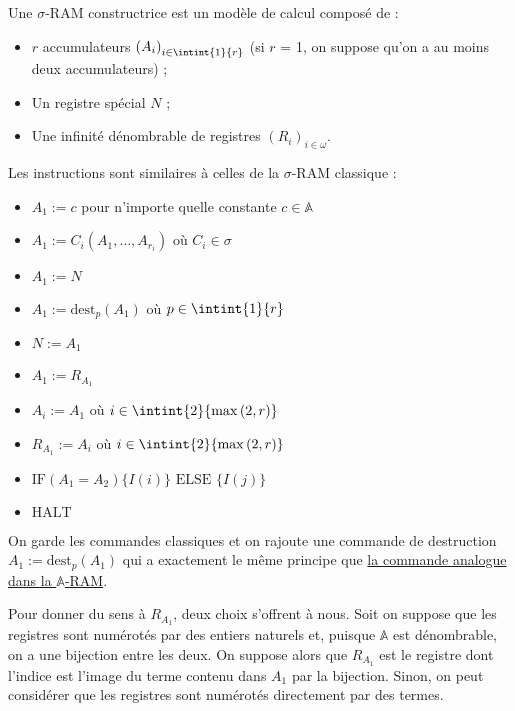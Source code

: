 \documentclass{report}
\newcommand{\sRAMifc}[2]{\text{IF} (A_1=A_2) \{I( #1 )\} \text{ ELSE } \{I( #2 )\}}
\newcommand{\bbA}{\mathbb{A}}
\begin{document}
				\begin{definition}
					\label{def:sigma_RAM_constructrice}
					Une $\sigma$-RAM constructrice est un modèle de calcul composé de :
					
					\begin{itemize}[itemsep=-1mm]
						\item	$r$ accumulateurs $\left(A_i\right)_{i\in \intint{1}{r}}$ (si $r$ = 1, on suppose qu'on a au moins deux accumulateurs) ;
						\item 	Un registre spécial $N$ ;
						\item 	Une infinité dénombrable de registres $\left( R_i\right)_{i \in \omega}$.
					\end{itemize}
				
					
					Les instructions sont similaires à celles de la $\sigma$-RAM classique :
					
					\begin{itemize}[itemsep=-1mm]
						\item 	$A_1 := c$ pour n'importe quelle constante $c \in \bbA$
						\item 	$A_1 := C_i(A_1, \dots, A_{r_i})$ où $C_i \in \sigma$
						\item 	$A_1 := N$
						\item 	$A_1 := \text{dest}_p(A_1)$ où $p \in \intint{1}{r}$
						\item 	$N := A_1$
						\item 	$A_1 := R_{A_1}$
						\item 	$A_i := A_1$ où $i \in \intint{2}{\max\left( 2, r \right)}$
						\item 	$R_{A_1} := A_i$ où $i \in \intint{2}{\max\left( 2, r \right)}$
						\item 	$\sRAMifc{i}{j}$
						\item 	$\text{HALT}$
					\end{itemize}
					
					On garde les commandes classiques et on rajoute une commande de destruction $A_1 := \text{dest}_p(A_1)$ qui a exactement le même principe que \hyperref[def:A_RAM]{la commande analogue dans la $\bbA$-RAM}.
				\end{definition}
				
				Pour donner du sens à $R_{A_1}$, deux choix s'offrent à nous. Soit on suppose que les registres sont numérotés par des entiers naturels et, puisque $\bbA$ est dénombrable, on a une bijection entre les deux. On suppose alors que $R_{A_1}$ est le registre dont l'indice est l'image du terme contenu dans $A_1$ par la bijection. Sinon, on peut considérer que les registres sont numérotés directement par des termes.
				
\end{document}
